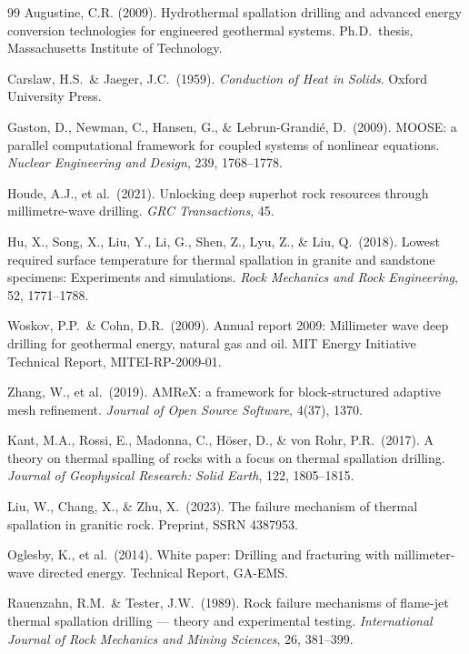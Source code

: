 \documentclass[12pt, a4paper]{article}
\begin{document}
\begin{thebibliography}{99}
Augustine, C.R. (2009).
Hydrothermal spallation drilling and advanced energy conversion technologies
for engineered geothermal systems.
Ph.D.\ thesis, Massachusetts Institute of Technology.

Carslaw, H.S.\ \& Jaeger, J.C.\ (1959).
\textit{Conduction of Heat in Solids}.
Oxford University Press.

Gaston, D., Newman, C., Hansen, G., \& Lebrun-Grandi\'{e}, D.\ (2009).
MOOSE: a parallel computational framework for coupled systems of nonlinear
equations.
\textit{Nuclear Engineering and Design}, 239, 1768--1778.

Houde, A.J., et al.\ (2021).
Unlocking deep superhot rock resources through millimetre-wave drilling.
\textit{GRC Transactions}, 45.

Hu, X., Song, X., Liu, Y., Li, G., Shen, Z., Lyu, Z., \& Liu, Q.\ (2018).
Lowest required surface temperature for thermal spallation in granite and
sandstone specimens: Experiments and simulations.
\textit{Rock Mechanics and Rock Engineering}, 52, 1771--1788.

Woskov, P.P.\ \& Cohn, D.R.\ (2009).
Annual report 2009: Millimeter wave deep drilling for geothermal energy,
natural gas and oil.
MIT Energy Initiative Technical Report, MITEI-RP-2009-01.

Zhang, W., et al.\ (2019).
AMReX: a framework for block-structured adaptive mesh refinement.
\textit{Journal of Open Source Software}, 4(37), 1370.

Kant, M.A., Rossi, E., Madonna, C., H\"{o}ser, D., \& von Rohr, P.R.\ (2017).
A theory on thermal spalling of rocks with a focus on thermal spallation drilling.
\textit{Journal of Geophysical Research: Solid Earth}, 122, 1805--1815.

Liu, W., Chang, X., \& Zhu, X.\ (2023).
The failure mechanism of thermal spallation in granitic rock.
Preprint, SSRN 4387953.

Oglesby, K., et al.\ (2014).
White paper: Drilling and fracturing with millimeter-wave directed energy.
Technical Report, GA-EMS.

Rauenzahn, R.M.\ \& Tester, J.W.\ (1989).
Rock failure mechanisms of flame-jet thermal spallation drilling — theory
and experimental testing.
\textit{International Journal of Rock Mechanics and Mining Sciences}, 26, 381--399.


\end{thebibliography}
\end{document}
